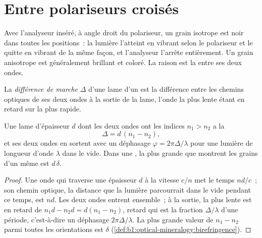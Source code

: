 \section{Entre polariseurs croisés}

Avec l'analyseur inséré, à angle droit du polariseur, un grain isotrope est noir
dans toutes les positions~: la lumière l'atteint en vibrant selon le polariseur et
le quitte en vibrant de la même façon, et l'analyseur l'arrête entièrement. Un
grain anisotrope est généralement brillant et coloré. La raison est la  entre ses deux ondes.

\begin{definition}\label{def:b1:optical-mineralogy:retardation}
La \emph{différence de marche} $\Delta$ d'une lame d'un  est la
différence entre les chemins optiques de ses deux ondes à la sortie de la lame,
l'onde la plus lente étant en retard sur la plus rapide.
\end{definition}

\begin{proposition}\label{prop:b1:optical-mineralogy:retardation}
Une lame d'épaisseur $d$ dont les deux ondes ont les indices $n_1 > n_2$ a la
\[
  \Delta = d\,(n_1 - n_2),
\]
et ses deux ondes en sortent avec un déphasage $\varphi = 2\pi\Delta/\lambda$
pour une lumière de longueur d'onde $\lambda$ dans le vide. Dans une ,
la plus grande  que montrent les grains d'un même  est
$d\,\delta$.
\end{proposition}

\begin{proof}
Une onde qui traverse une épaisseur $d$ à la vitesse $c/n$ met le temps $nd/c$~;
son chemin optique, la distance que la lumière parcourrait dans le vide pendant ce
temps, est $nd$. Les deux ondes entrent ensemble~; à la sortie, la plus lente est
en retard de $n_1 d - n_2 d = d(n_1 - n_2)$, retard qui est la fraction
$\Delta/\lambda$ d'une période, c'est-à-dire un déphasage $2\pi\Delta/\lambda$.
La plus grande valeur de $n_1 - n_2$ parmi toutes les orientations est $\delta$
(\cref{def:b1:optical-mineralogy:birefringence}).
\end{proof}

